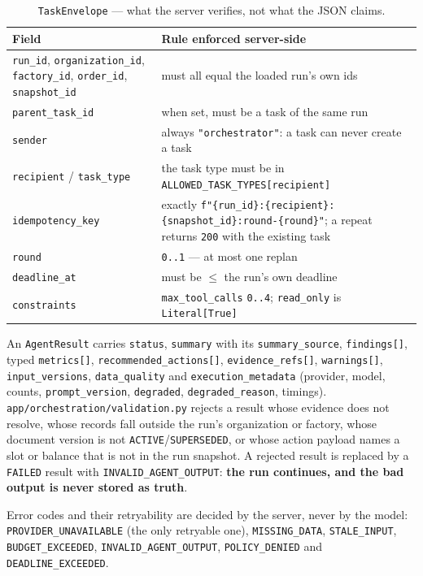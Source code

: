 \documentclass[11pt,a4paper]{article}
\begin{document}
\begin{table}[h]
\centering\small
\caption{\texttt{TaskEnvelope} --- what the server verifies, not what the JSON claims.}
\begin{tabularx}{\linewidth}{@{}L{4.1cm}Y@{}}
\toprule
\textbf{Field} & \textbf{Rule enforced server-side}\\
\midrule
\texttt{run\_id}, \texttt{organization\_id}, \texttt{factory\_id}, \texttt{order\_id}, \texttt{snapshot\_id} & must all equal the loaded run's own ids\\
\texttt{parent\_task\_id} & when set, must be a task of the same run\\
\texttt{sender} & always \texttt{"orchestrator"}: a task can never create a task\\
\texttt{recipient} / \texttt{task\_type} & the task type must be in \texttt{ALLOWED\_TASK\_TYPES[recipient]}\\
\texttt{idempotency\_key} & exactly \texttt{f"\{run\_id\}:\{recipient\}:\{snapshot\_id\}:round-\{round\}"}; a repeat returns \texttt{200} with the existing task\\
\texttt{round} & \texttt{0..1} --- at most one replan\\
\texttt{deadline\_at} & must be $\le$ the run's own deadline\\
\texttt{constraints} & \texttt{max\_tool\_calls} \texttt{0..4}; \texttt{read\_only} is \texttt{Literal[True]}\\
\bottomrule
\end{tabularx}
\end{table}

An \texttt{AgentResult} carries \texttt{status}, \texttt{summary} with its
\texttt{summary\_source}, \texttt{findings[]}, typed \texttt{metrics[]},
\texttt{recommended\_actions[]}, \texttt{evidence\_refs[]}, \texttt{warnings[]},
\texttt{input\_versions}, \texttt{data\_quality} and
\texttt{execution\_metadata} (provider, model, counts, \texttt{prompt\_version},
\texttt{degraded}, \texttt{degraded\_reason}, timings).
\texttt{app/orchestration/validation.py} rejects a result whose evidence does
not resolve, whose records fall outside the run's organization or factory, whose
document version is not \texttt{ACTIVE}/\texttt{SUPERSEDED}, or whose action
payload names a slot or balance that is not in the run snapshot. A rejected
result is replaced by a \texttt{FAILED} result with
\texttt{INVALID\_AGENT\_OUTPUT}: \textbf{the run continues, and the bad output is
never stored as truth}.

Error codes and their retryability are decided by the server, never by the
model:
\texttt{PROVIDER\_UNAVAILABLE} (the only retryable one),
\texttt{MISSING\_DATA},
\texttt{STALE\_INPUT},
\texttt{BUDGET\_EXCEEDED},
\texttt{INVALID\_AGENT\_OUTPUT},
\texttt{POLICY\_DENIED} and
\texttt{DEADLINE\_EXCEEDED}.
\end{document}
